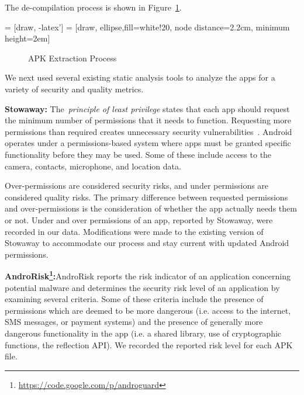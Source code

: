 \documentclass{sig-alternate-05-2015}
\begin{document}
The de-compilation process is shown in Figure~\ref{fig:extractionprocess}.


 = [draw, -latex']
 = [draw, ellipse,fill=white!20, node distance=2.2cm,
    minimum height=2em]

	\begin{figure}[h]
	\begin{center}

\caption{APK Extraction Process}
\label{fig:extractionprocess}
\end{center}
\end{figure}


We next used several existing static analysis tools to analyze the apps for a variety of security and quality metrics.

\textbf{Stowaway\cite{Felt:2011:APD:2046707.2046779}:} The~\emph{principle of least privilege} states that each app should request the minimum number of permissions that it needs to function. Requesting more permissions than required creates unnecessary security vulnerabilities~\cite{saltzer1975protection}. Android operates under a permissions-based system where apps must be granted specific functionality before they may be used. Some of these include access to the camera, contacts, microphone, and location data.

Over-permissions are considered security risks, and under permissions are considered quality risks. The primary difference between requested permissions and over-permissions is the consideration of whether the app actually needs them or not. Under and over permissions of an app, reported by Stowaway, were recorded in our data. Modifications were made to the existing version of Stowaway to accommodate our process and stay current with updated Android permissions.


\textbf{AndroRisk\footnote{\url{https://code.google.com/p/androguard}}:}AndroRisk reports the risk indicator of an application concerning potential malware and determines the security risk level of an application by examining several criteria. Some of these criteria include the presence of permissions which are deemed to be more dangerous (i.e. access to the internet, SMS messages, or payment systems) and the presence of generally more dangerous functionality in the app (i.e. a shared library, use of cryptographic functions, the reflection API). We recorded the reported risk level for each APK file.
\end{document}
